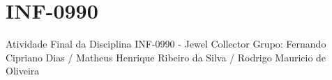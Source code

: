 \chapter{INF-\/0990}
\hypertarget{md__i_n_f-0990_2_r_e_a_d_m_e}{}\label{md__i_n_f-0990_2_r_e_a_d_m_e}
\label{md__i_n_f-0990_2_r_e_a_d_m_e_autotoc_md0}%
%
Atividade Final da Disciplina INF-\/0990 -\/ Jewel Collector Grupo\+: Fernando Cipriano Dias / Matheus Henrique Ribeiro da Silva / Rodrigo Mauricio de Oliveira 